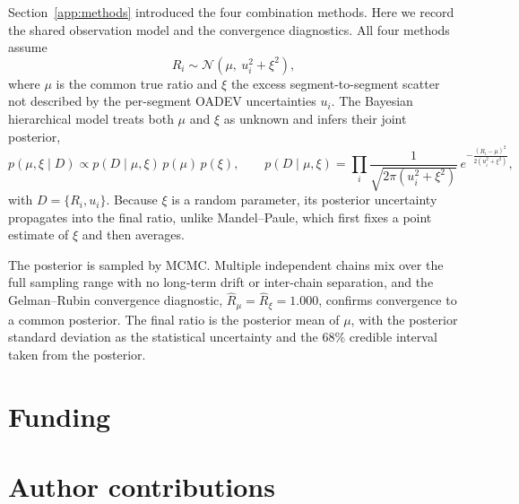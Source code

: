 \documentclass[11pt,a4paper]{article}
\begin{document}
Section~\ref{app:methods} introduced the four combination methods. Here
we record the shared observation model and the convergence diagnostics.
All four methods assume
\begin{equation}
  R_i \sim \mathcal{N}\!\left(\mu,\ u_i^{2} + \xi^{2}\right),
  \label{eq:obs}
\end{equation}
where $\mu$ is the common true ratio and $\xi$ the excess
segment-to-segment scatter not described by the per-segment OADEV
uncertainties $u_i$. The Bayesian hierarchical model treats both $\mu$
and $\xi$ as unknown and infers their joint posterior,
\begin{equation}
  p(\mu,\xi \mid D) \propto p(D \mid \mu,\xi)\,p(\mu)\,p(\xi),
  \qquad
  p(D\mid\mu,\xi) = \prod_i
    \frac{1}{\sqrt{2\pi(u_i^{2}+\xi^{2})}}\,
    e^{-\frac{(R_i-\mu)^{2}}{2(u_i^{2}+\xi^{2})}},
  \label{eq:bayes}
\end{equation}
with $D = \{R_i, u_i\}$. Because $\xi$ is a random parameter, its
posterior uncertainty propagates into the final ratio, unlike
Mandel--Paule, which first fixes a point estimate of $\xi$ and then
averages.

The posterior is sampled by MCMC. Multiple independent chains mix over
the full sampling range with no long-term drift or inter-chain
separation, and the Gelman--Rubin convergence diagnostic,
$\hat{R}_{\mu} = \hat{R}_{\xi} = 1.000$, confirms convergence to a common
posterior. The final ratio is the posterior mean of $\mu$, with the
posterior standard deviation as the statistical uncertainty and the $68\%$
credible interval taken from the posterior.



\section*{Funding}


\section*{Author contributions}
\end{document}
